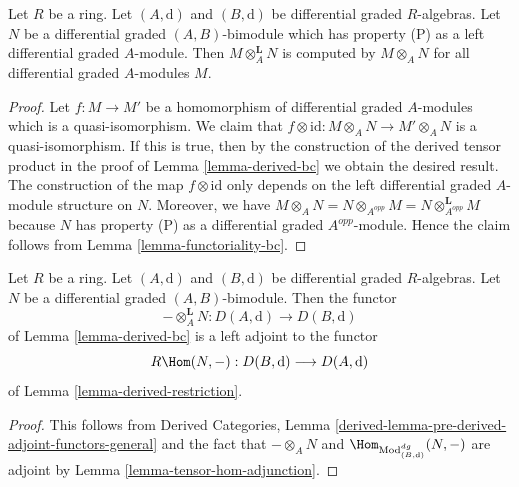 \begin{lemma}
\label{lemma-compute-bc}
Let $R$ be a ring. Let $(A, \text{d})$ and $(B, \text{d})$ be
differential graded $R$-algebras. Let $N$ be a differential graded
$(A, B)$-bimodule which has property (P) as a left differential graded
$A$-module. Then $M \otimes_A^\mathbf{L} N$ is computed by
$M \otimes_A N$ for all differential graded $A$-modules $M$.
\end{lemma}

\begin{proof}
Let $f : M \to M'$ be a homomorphism of differential graded $A$-modules
which is a quasi-isomorphism. We claim that $f \otimes \text{id} :
M \otimes_A N \to M' \otimes_A N$ is a quasi-isomorphism. If this
is true, then by the construction of the derived tensor product
in the proof of Lemma \ref{lemma-derived-bc} we obtain the desired result.
The construction of the map $f \otimes \text{id}$ only depends
on the left differential graded $A$-module structure on $N$.
Moreover, we have $M \otimes_A N = N \otimes_{A^{opp}} M =
N \otimes_{A^{opp}}^\mathbf{L} M$ because $N$ has property (P) as
a differential graded $A^{opp}$-module. Hence the claim follows
from Lemma \ref{lemma-functoriality-bc}.
\end{proof}

\begin{lemma}
\label{lemma-tensor-hom-adjoint}
Let $R$ be a ring.
Let $(A, \text{d})$ and $(B, \text{d})$ be differential graded $R$-algebras.
Let $N$ be a differential graded $(A, B)$-bimodule.
Then the functor
$$
- \otimes_A^\mathbf{L} N : D(A, \text{d}) \longrightarrow D(B, \text{d})
$$
of Lemma \ref{lemma-derived-bc} is a left adjoint to the functor
$$
R\Hom(N, -) : D(B, \text{d}) \longrightarrow D(A, \text{d})
$$
of Lemma \ref{lemma-derived-restriction}.
\end{lemma}

\begin{proof}
This follows from Derived Categories, Lemma
\ref{derived-lemma-pre-derived-adjoint-functors-general}
and the fact that $- \otimes_A N$ and
$\Hom_{\text{Mod}^{dg}_{(B, \text{d})}}(N, -)$ are adjoint by
Lemma \ref{lemma-tensor-hom-adjunction}.
\end{proof}

